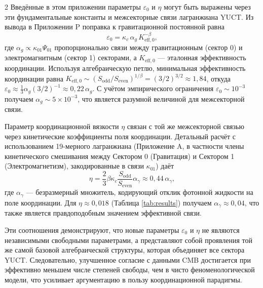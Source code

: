\documentclass[11pt,a4paper]{article}
\begin{document}
\begin{multicols}{2}
		Введённые в этом приложении параметры $\varepsilon_0$ и $\eta$ могут быть выражены через эти фундаментальные константы и межсекторные связи лагранжиана YUCT. Из вывода в Приложении P поправка к гравитационной постоянной равна
		\begin{equation}
			\varepsilon_0 = \kappa_c \, \alpha_g \, K_{\mathrm{eff},0}^{-\beta},
		\end{equation}
		где $\alpha_g \propto \kappa_{01} \Psi_{01}$ пропорционально связи между гравитационным (сектор 0) и электромагнитным (сектор 1) секторами, а $K_{\mathrm{eff},0}$ — эталонная эффективность координации. Используя алгебраическую петлю, минимальная эффективность координации равна $K_{\mathrm{eff},0} \sim (S_{\mathrm{odd}}/S_{\mathrm{even}})^{1/\beta} = (3/2)^{3/2} \approx 1,84$, откуда $\varepsilon_0 \approx \frac{1}{3} \alpha_g (3/2)^{-1} \approx 0,22\,\alpha_g$. С учётом эмпирического ограничения $\varepsilon_0 \sim 10^{-3}$ получаем $\alpha_g \sim 5\times10^{-3}$, что является разумной величиной для межсекторной связи.
		
		Параметр координационной вязкости $\eta$ связан с той же межсекторной связью через кинетические коэффициенты поля координации. Детальный расчёт с использованием 19-мерного лагранжиана (Приложение A, в частности члены кинетического смешивания между Сектором 0 (Гравитация) и Сектором 1 (Электромагнетизм), закодированные в связи $\kappa_{01}$) даёт
		\begin{equation}
			\eta = \frac{2}{3} \beta \kappa_c \frac{S_{\mathrm{odd}}}{S_{\mathrm{even}}} \alpha_\gamma \approx 0,44 \, \alpha_\gamma,
		\end{equation}
		где $\alpha_\gamma$ — безразмерный множитель, кодирующий отклик фотонной жидкости на поле координации. Для $\eta \approx 0,018$ (Таблица \ref{tab:results}) получаем $\alpha_\gamma \approx 0,04$, что также является правдоподобным значением эффективной связи.
		
		Эти соотношения демонстрируют, что новые параметры $\varepsilon_0$ и $\eta$ не являются независимыми свободными параметрами, а представляют собой проявления той же самой базовой алгебраической структуры, которая объединяет все сектора YUCT. Следовательно, улучшенное согласие с данными CMB достигается при эффективно меньшем числе степеней свободы, чем в чисто феноменологической модели, что усиливает аргументацию в пользу координационной парадигмы.
		
	\end{multicols}
	
\end{document}
